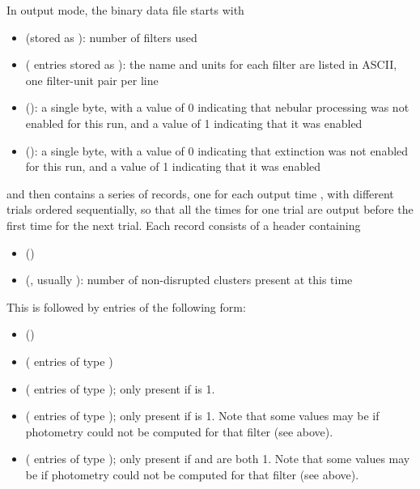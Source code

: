 \documentclass[letterpaper,10pt,english]{sphinxmanual}
\begin{document}
In  output mode, the binary data file starts with
\begin{itemize}
\item {} 
 (stored as ): number of filters used

\item {} 
  ( entries stored as ): the name and units for each filter are listed in ASCII, one filter-unit pair per line

\item {} 
 (): a single byte, with a value of 0 indicating that nebular processing was not enabled for this run, and a value of 1 indicating that it was enabled

\item {} 
 (): a single byte, with a value of 0 indicating that extinction was not enabled for this run, and a value of 1 indicating that it was enabled

\end{itemize}

and then contains a series of records, one for each output time , with different trials ordered sequentially, so that all the times for one trial are output before the first time for the next trial. Each record consists of a header containing
\begin{itemize}
\item {} 
 ()

\item {} 
 (, usually ): number of non-disrupted clusters present at this time

\end{itemize}

This is followed by  entries of the following form:
\begin{itemize}
\item {} 
 ()

\item {} 
 ( entries of type )

\item {} 
 ( entries of type ); only present if  is 1.

\item {} 
 ( entries of type ); only present if  is 1. Note that some values may be  if photometry could not be computed for that filter (see above).

\item {} 
 ( entries of type ); only present if  and  are both 1. Note that some values may be  if photometry could not be computed for that filter (see above).

\end{itemize}
\end{document}
